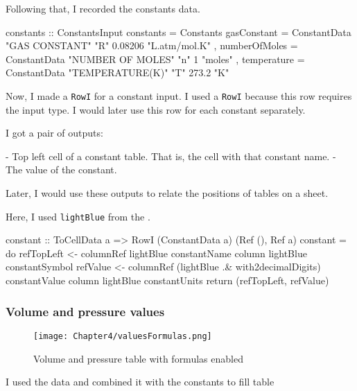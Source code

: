 Following that, I recorded the constants data.

\begin{mycode}
constants :: ConstantsInput
constants =
  Constants
    { gasConstant =
        ConstantData "GAS CONSTANT" "R" 0.08206 "L.atm/mol.K"
    , numberOfMoles =
        ConstantData "NUMBER OF MOLES" "n" 1 "moles"
    , temperature =
        ConstantData "TEMPERATURE(K)" "T" 273.2 "K"
    }
\end{mycode}

Now, I made a \texttt{RowI} for a constant input.
I used a \texttt{RowI} because this row requires the input type.
I would later use this row for each constant separately.

I got a pair of outputs:

- Top left cell of a constant table. That is, the cell with that constant name.
- The value of the constant.

Later, I would use these outputs to relate the positions of tables on a sheet.

Here, I used \texttt{lightBlue} from the .

\begin{mycode}
constant :: ToCellData a => RowI (ConstantData a) (Ref (), Ref a)
constant = do
  refTopLeft <- columnRef lightBlue constantName
  column lightBlue constantSymbol
  refValue <- columnRef (lightBlue .& with2decimalDigits) constantValue
  column lightBlue constantUnits
  return (refTopLeft, refValue)
\end{mycode}

\subsubsection{Volume and pressure values}

\begin{figure}[h]
  \centering
  \texttt{[image: Chapter4/valuesFormulas.png]}
  \caption{Volume and pressure table with formulas enabled}
  \label{fig:valuesFormulas}
\end{figure}

I used the data and combined it with the constants to fill table 


